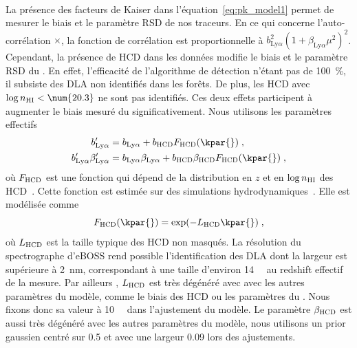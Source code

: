 \paragraph{}
La présence des facteurs de Kaiser dans l'équation~\ref{eq:pk_model1} permet de mesurer le biais et le paramètre RSD de nos traceurs. En ce qui concerne l'auto-corrélation \lya{}$\times$\lya{}, la fonction de corrélation est proportionnelle à $b_{\mathrm{Ly}\alpha}^2(1+\beta_{\mathrm{Ly}\alpha} \mu^2)^2$. Cependant, la présence de HCD dans les données modifie le biais et le paramètre RSD du \lya{}. En effet, l'efficacité de l'algorithme de détection n'étant pas de \SI{100}{\percent}, il subsiste des DLA non identifiés dans les forêts. De plus, les HCD avec $\log n_{\textsc{HI}} < \num{20.3}$ ne sont pas identifiés. Ces deux effets participent à augmenter le biais mesuré du \lya{} significativement. Nous utilisons les paramètres effectifs
\begin{align}
  \label{eq:bias_hcd_def}
  b_{\mathrm{Ly}\alpha}' &= b_{\mathrm{Ly}\alpha} + b_{\textsc{HCD}} F_{\textsc{HCD}}(\kpar{}) \; , \\
  b_{\mathrm{Ly}\alpha}' \beta_{\mathrm{Ly}\alpha}' &= b_{\mathrm{Ly}\alpha} \beta_{\mathrm{Ly}\alpha} + b_{\textsc{HCD}} \beta_{\textsc{HCD}} F_{\textsc{HCD}}(\kpar{})  \; ,
\end{align}
où $F_{\textsc{HCD}}$ est une fonction qui dépend de la distribution en $z$ et en $\log n_{\textsc{HI}}$ des HCD~\autocite{Font-Ribera2012a}. Cette fonction est estimée sur des simulations hydrodynamiques~\autocite{Rogers2017}. Elle est modélisée comme
\begin{equation}
  \label{eq:f_hcd_def}
  F_{\textsc{HCD}}(\kpar{}) = \exp(- L_{\textsc{HCD}} \kpar{}) \; ,
\end{equation}
où $L_{\textsc{HCD}}$ est la taille typique des HCD non masqués. La résolution du spectrographe d'eBOSS rend possible l'identification des DLA dont la largeur est supérieure à \SI{2}{\nano\meter}, correspondant à une taille d'environ \SI{14}{\perh\Mpc} au redshift effectif de la mesure. Par ailleurs , $L_{\textsc{HCD}}$ est très dégénéré avec avec les autres paramètres du modèle, comme le biais des HCD ou les paramètres du \lya{}. Nous fixons donc sa valeur à \SI{10}{\perh\Mpc} dans l'ajustement du modèle. Le paramètre $\beta_{\textsc{HCD}}$ est aussi très dégénéré avec les autres paramètres du modèle, nous utilisons un prior gaussien centré sur \num{0.5} et avec une largeur \num{0.09} lors des ajustements.

